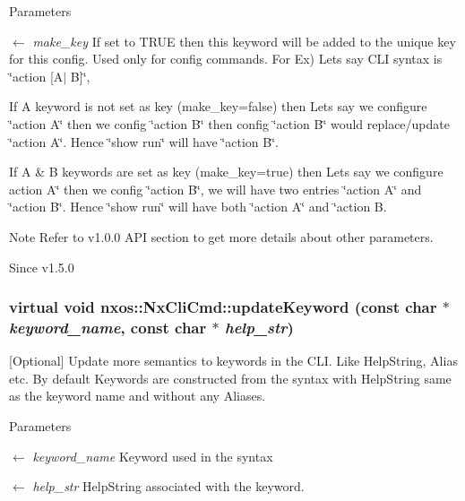 \begin{DoxyParams}{Parameters}
\item[\mbox{$\leftarrow$} {\em make\_\-key}]If set to TRUE then this keyword will be added to the unique key for this config. Used only for config commands. For Ex) Lets say CLI syntax is \char`\"{}action \mbox{[}A$|$ B\mbox{]}\char`\"{},
\begin{DoxyItemize}
\item If A keyword is not set as key (make\_\-key=false) then Lets say we configure \char`\"{}action A\char`\"{} then we config \char`\"{}action B\char`\"{} then config \char`\"{}action B\char`\"{} would replace/update \char`\"{}action A\char`\"{}. Hence \char`\"{}show run\char`\"{} will have \char`\"{}action B\char`\"{}.
\item If A \& B keywords are set as key (make\_\-key=true) then Lets say we configure action A\char`\"{} then we config \char`\"{}action B\char`\"{}, we will
                     have two entries \char`\"{}action A\char`\"{} and \char`\"{}action B\char`\"{}. Hence \char`\"{}show run\char`\"{}
                     will have both \char`\"{}action A\char`\"{} and \char`\"{}action B.
\end{DoxyItemize}\end{DoxyParams}
\begin{DoxyNote}{Note}
Refer to v1.0.0 API section to get more details about other parameters.
\end{DoxyNote}
\begin{DoxySince}{Since}
v1.5.0 
\end{DoxySince}
\hypertarget{classnxos_1_1NxCliCmd_aa698fdd1026739307e0710e2948f19f5}{
\subsubsection[{updateKeyword}]{\setlength{\rightskip}{0pt plus 5cm}virtual void nxos::NxCliCmd::updateKeyword (const char $\ast$ {\em keyword\_\-name}, \/  const char $\ast$ {\em help\_\-str})}}
\label{classnxos_1_1NxCliCmd_aa698fdd1026739307e0710e2948f19f5}
\mbox{[}Optional\mbox{]} Update more semantics to keywords in the CLI. Like HelpString, Alias etc. By default Keywords are constructed from the syntax with HelpString same as the keyword name and without any Aliases. 
\begin{DoxyParams}{Parameters}
\item[\mbox{$\leftarrow$} {\em keyword\_\-name}]Keyword used in the syntax \item[\mbox{$\leftarrow$} {\em help\_\-str}]HelpString associated with the keyword.\end{DoxyParams}

